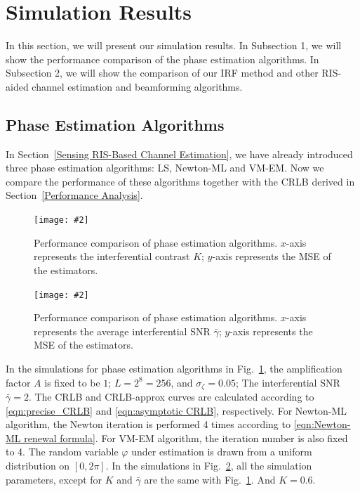 \documentclass[12pt,draftclsnofoot,journal,onecolumn]{IEEEtran}
\theoremstyle{nonumberplain}
\newcommand{\myincludegraphics}[2][width=12cm]{\texttt{[image: \#2]}}
\begin{document}
\section{Simulation Results}
\label{Simulation Results}
In this section, we will present our simulation results. In Subsection 1, we will show the performance comparison of the phase estimation algorithms. In Subsection 2, we will show the comparison of our \ac{IRF} method and other RIS-aided channel estimation and beamforming algorithms. 

\subsection{Phase Estimation Algorithms} 
    In Section~\ref{Sensing RIS-Based Channel Estimation}, we have already introduced three phase estimation algorithms: LS, Newton-ML and VM-EM. Now we compare the performance of these algorithms together with the CRLB derived in Section~\ref{Performance Analysis}.  
    \begin{figure}[!t]
        \centering
        \myincludegraphics{data/pe_K.pdf}
        \caption{Performance comparison of phase estimation algorithms. $x$-axis represents the interferential contrast $K$; $y$-axis represents the MSE of the estimators.}
        \label{fig:phase estimation_K}
    \end{figure}
    \begin{figure}[!t]
        \centering
        \myincludegraphics{data/pe_gamma.pdf}
        \caption{Performance comparison of phase estimation algorithms. $x$-axis represents the average interferential SNR $\bar{\gamma}$; $y$-axis represents the MSE of the estimators.}
        \label{fig:phase estimation_gamma}
    \end{figure}
    In the simulations for phase estimation algorithms in Fig.~\ref{fig:phase estimation_K}, the amplification factor $A$ is fixed to be $1$; $L=2^8=256$, and $\sigma_\zeta=0.05$; The interferential SNR $\bar{\gamma}=2$. The CRLB and CRLB-approx curves are calculated according to \eqref{eqn:precise_CRLB} and \eqref{eqn:asymptotic CRLB}, respectively. For Newton-ML algorithm, the Newton iteration is performed 4 times according to \eqref{eqn:Newton-ML renewal formula}. For VM-EM algorithm, the iteration number is also fixed to 4. The random variable $\varphi$ under estimation is drawn from a uniform distribution on $[0,2\pi]$. In the simulations in Fig.~\ref{fig:phase estimation_gamma}, all the simulation parameters, except for $K$ and $\bar{\gamma}$ are the same with Fig.~\ref{fig:phase estimation_K}. And $K=0.6$.  
\end{document}
